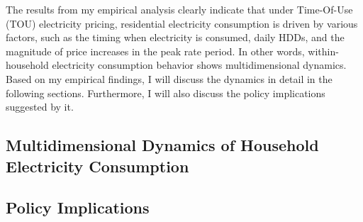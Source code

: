 The results from my empirical analysis clearly indicate that under Time-Of-Use (TOU) electricity pricing, residential electricity consumption is driven by various factors, such as the timing when electricity is consumed, daily HDDs, and the magnitude of price increases in the peak rate period. In other words, within-household electricity consumption behavior shows multidimensional dynamics. Based on my empirical findings, I will discuss the dynamics in detail in the following sections. Furthermore, I will also discuss the policy implications suggested by it. 

\subsection{Multidimensional Dynamics of Household Electricity Consumption}
\label{Subsection:Multidimensional-Dynamics-of-Household-Electricity-Consumption}



\subsection{Policy Implications}
\label{Subsection:Policy-Implications}


